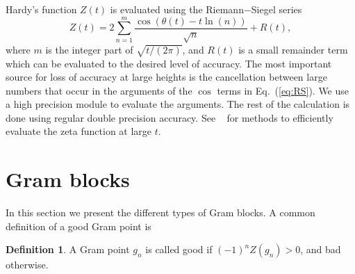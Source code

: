 \documentclass[twoside]{article}
\theoremstyle{definition}
\newtheorem{defn}{Definition}
\begin{document}
Hardy's function $Z(t)$  is evaluated using the Riemann$-$Siegel series
\begin{equation}
Z(t) = 2\sum^{m}_{n=1}\frac{\cos(\theta(t) - t \ln (n))}{\sqrt{n}} + R(t), 
\label{eq:RS}
\end{equation}
where $m$ is the integer part of $\sqrt{t/(2\pi)}$, and $R(t)$ is a small remainder
term which can be evaluated to the desired level of accuracy. The most important 
source for loss of accuracy at large heights is the cancellation between
large numbers that occur in the arguments of the $\cos$ terms in Eq.~(\ref{eq:RS}). We 
use a high precision module to evaluate the arguments. The rest of the calculation
is done using regular double precision accuracy. See ~\cite{Odlyzko 1992,hiary,gourdon} for methods to efficiently evaluate the zeta function at large $t$.

\section{\label{sec4}Gram blocks}


In this section we present the different types of Gram blocks. A common definition of a good Gram point is
\begin{defn}\label{good1}
A Gram point $g_n$ is called good if $(-1)^nZ(g_n) > 0$, and bad otherwise.
\end{defn}
\end{document}
